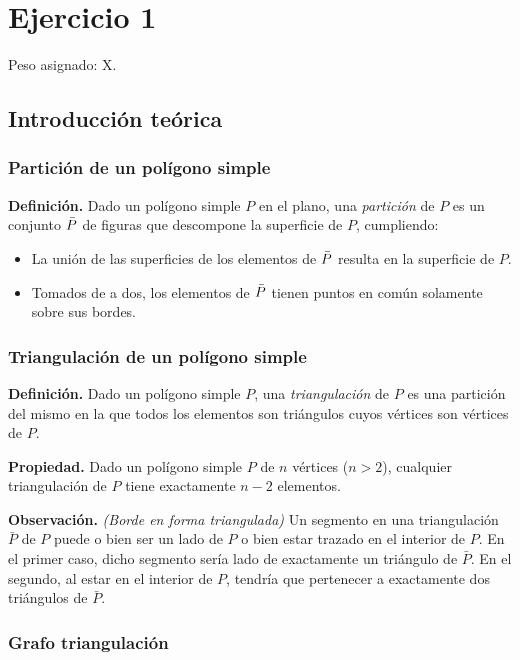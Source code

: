 \section{Ejercicio 1}

Peso asignado: X.

\subsection{Introducción teórica}

\subsubsection{Partición de un polígono simple}

\textbf{Definición.} Dado un polígono simple $P$ en el plano, una \textit{partición} de $P$ es un conjunto $\bar{P}$ de figuras que descompone la superficie de $P$, cumpliendo:
\begin{itemize}
\setlength\itemsep{0em}
\item La unión de las superficies de los elementos de $\bar{P}$ resulta en la superficie de $P$.
\item Tomados de a dos, los elementos de $\bar{P}$ tienen puntos en común solamente sobre sus bordes.
\end{itemize}

\subsubsection{Triangulación de un polígono simple}

\textbf{Definición.} Dado un polígono simple $P$, una \textit{triangulación} de $P$ es una partición del mismo en la que todos los elementos son triángulos cuyos vértices son vértices de $P$. 

\medskip

\textbf{Propiedad.} Dado un polígono simple $P$ de $n$ vértices ($n > 2$), cualquier triangulación de $P$ tiene exactamente $n-2$ elementos.

\medskip

\textbf{Observación.} \textit{(Borde en forma triangulada)} Un segmento en una triangulación $\bar{P}$ de $P$ puede o bien ser un lado de $P$ o bien estar trazado en el interior de $P$. En el primer caso, dicho segmento sería lado de exactamente un triángulo de $\bar{P}$. En el segundo, al estar en el interior de $P$, tendría que pertenecer a exactamente dos triángulos de $\bar{P}$.

\subsubsection{Grafo triangulación}

